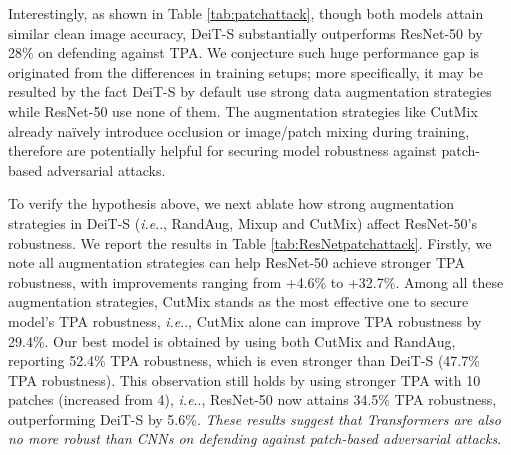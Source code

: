 \documentclass{article}
\makeatletter
\DeclareRobustCommand\onedot{\futurelet\@let@token\@onedot}
\def\@onedot{\ifx\@let@token.\else.\null\fi\xspace}
\def\ie{\emph{i.e}\onedot} \def\Ie{\emph{I.e}\onedot}
\makeatother
\begin{document}
Interestingly, as shown in Table \ref{tab:patchattack}, though both models attain similar clean image accuracy, DeiT-S substantially outperforms ResNet-50 by 28\% on defending against TPA. We conjecture such huge performance gap is originated from the differences in training setups; more specifically, it may be resulted by the fact DeiT-S by default use strong data augmentation strategies while ResNet-50 use none of them. The augmentation strategies like CutMix already na\"ively introduce occlusion or image/patch mixing during training, therefore are potentially helpful for securing model robustness against patch-based adversarial attacks.

To verify the hypothesis above, we next ablate how strong augmentation strategies in DeiT-S (\ie, RandAug, Mixup and CutMix) affect ResNet-50's robustness. We report the results in Table \ref{tab:ResNetpatchattack}. Firstly, we note all augmentation strategies can help ResNet-50 achieve stronger TPA robustness, with improvements ranging from +4.6\% to +32.7\%. Among all these augmentation strategies, CutMix stands as the most effective one to secure model's TPA robustness, \ie, CutMix alone can improve TPA robustness by 29.4\%. Our best model is obtained by using both CutMix and RandAug, reporting 52.4\% TPA robustness, which is even stronger than DeiT-S (47.7\% TPA robustness). This observation still holds by using stronger TPA with 10 patches (increased from 4), \ie, ResNet-50 now attains 34.5\% TPA robustness, outperforming DeiT-S by 5.6\%.  \emph{These results suggest that Transformers are also no more robust than CNNs on defending against patch-based adversarial attacks}.
\end{document}
